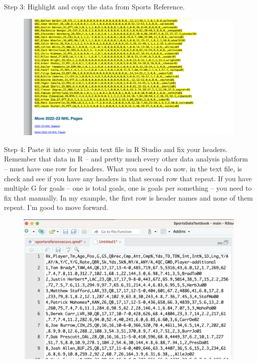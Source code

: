 \documentclass[
  letterpaper,
  DIV=11,
  numbers=noendperiod]{scrreprt}
\begin{document}
Step 3: Highlight and copy the data from Sports Reference.

\begin{figure}

{\centering \includegraphics[width=1\textwidth,height=\textheight]{./images/csv4.png}

}

\end{figure}

Step 4: Paste it into your plain text file in R Studio and fix your
headers. Remember that data in R -- and pretty much every other data
analysis platform -- must have one row for headers. What you need to do
now, in the text file, is check and see if you have any headers in that
second row that repeat. If you have multiple G for goals -- one is total
goals, one is goals per something -- you need to fix that manually. In
my example, the first row is header names and none of them repeat. I'm
good to move forward.

\begin{figure}

{\centering \includegraphics[width=1\textwidth,height=\textheight]{./images/csv5.png}

}

\end{figure}
\end{document}
